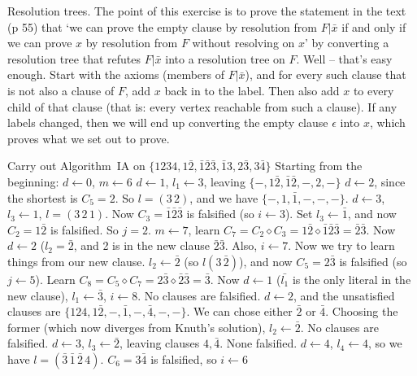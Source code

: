  Resolution trees.\hfil\break
The point of this exercise is to prove the statement in the text (p 55) that `we can prove
the empty clause by resolution from $F | \bar{x}$ if and only if we can prove $x$ by
resolution from $F$ without resolving on $x$' by converting a resolution tree that
refutes $F | \bar{x}$ into a resolution tree on $F$.  Well -- that's easy enough.
Start with the axioms (members of $F | {\bar x}$), and for every such clause that is
not also a clause of $F$, add $x$ back in to the label.  Then also add $x$ to every
child of that clause (that is: every vertex reachable from such a clause).  If any
labels changed, then we will end up converting the empty clause $\epsilon$ into $x$,
which proves what we set out to prove.

 Carry out Algorithm~IA on $\{1234, 1 \bar 2, \bar 1 \bar 2 \bar 3,
\bar 1 3, 2 \bar 3, 3 \bar 4 \}$\hfil\break
Starting from the beginning:
 $d \gets 0$, $m \gets 6$
 $d \gets 1$, $l_1 \gets 3$, leaving $\{-, 1 \bar 2, \bar 1 \bar 2, -, 2, - \}$
 $d \gets 2$, since the shortest is $C_5 = 2$.  So $l = \left(3\,2\right)$,
 and we have $\{-, 1, \bar 1, -, -, - \}$.
 $d \gets 3$, $l_3 \gets 1$, $l = \left(3\,2\,1\right)$.
 Now $C_3 = \bar 1 \bar 2 \bar 3$ is falsified (so $i \gets 3$).
 Set $l_3 \gets \bar 1$, and now $C_2 = 1 \bar 2$ is falsified.  So $j = 2$.
 $m \gets 7$, learn $C_7 = C_2 \diamond C_3 = 1 \bar 2 \diamond \bar 1 \bar 2 \bar 3 = 
 \bar 2 \bar 3$.  Now $d \gets 2$ ($l_2 = \bar 2$, and 2 is in the new clause $\bar 2 \bar 3$.
 Also, $i \gets 7$.
 Now we try to learn things from our new clause. $l_2 \gets \bar 2$ (so
$l \left(3\, \bar 2\right)$), and now $C_5 = 2 \bar 3$ is falsified (so $j \gets 5$).
 Learn $C_8 = C_5 \diamond C_7 = 2 \bar 3 \diamond \bar 2 \bar 3 = \bar 3$.
  Now $d \gets 1$ ($\bar {l_1}$ is the only literal in the new clause), $l_1 \gets \bar 3$, $i \gets 8$.
 No clauses are falsified.
 $d \gets 2$, and the unsatisfied clauses are $\{124, 1 \bar 2, -, \bar 1, -, \bar 4, -, -\}$.
  We can chose either $\bar 2$ or $\bar 4$.  Choosing the former (which now diverges from Knuth's
  solution), $l_2 \gets \bar 2$.
 No clauses are falsified.
 $d \gets 3$, $l_3 \gets \bar 2$, leaving clauses $4, \bar 4$.
 None falsified.
 $d \gets 4$, $l_4 \gets 4$, so we have $l = \left(\bar 3\, \bar 1\, \bar 2\, 4\right)$.
 $C_6 = 3 \bar 4$ is falsified, so $i \gets 6$
